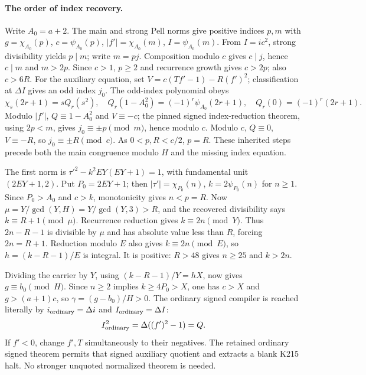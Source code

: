 \paragraph{The order of index recovery.}
Write $A_0=a+2$. The main and strong Pell norms give positive indices $p,m$
with $g=\chi_{A_0}(p)$, $c=\psi_{A_0}(p)$,
$|f'|=\chi_{A_0}(m)$, $I=\psi_{A_0}(m)$.
From $I=ic^2$, strong divisibility yields $p\mid m$; write $m=pj$.
Composition modulo $c$ gives $c\mid j$, hence $c\mid m$ and $m>2p$.
Since $c>1$, $p\ge2$ and recurrence growth gives $c>2p$; also $c>6R$.
For the auxiliary equation, set
$V=c(Tf'-1)-R(f')^2$; classification at $\Delta I$ gives an odd index
$j_0$. The odd-index polynomial obeys
\[
 \chi_s(2r+1)=sQ_r(s^2),\quad
 Q_r(1-A_0^2)=(-1)^r\psi_{A_0}(2r+1),\quad
 Q_r(0)=(-1)^r(2r+1).
\]
Modulo $|f'|$, $Q\equiv1-A_0^2$ and $V\equiv-c$; the pinned signed
index-reduction theorem, using $2p<m$, gives $j_0\equiv\pm p\pmod m$,
hence modulo $c$. Modulo $c$, $Q\equiv0$, $V\equiv-R$, so
$j_0\equiv\pm R\pmod c$. As $0<p,R<c/2$, $p=R$.
These inherited steps precede both the main congruence modulo $H$ and the
missing index equation.

The first norm is $\tau'^2-k^2EY(EY+1)=1$, with fundamental unit
$(2EY+1,2)$. Put $P_0=2EY+1$; then
$|\tau'|=\chi_{P_0}(n)$, $k=2\psi_{P_0}(n)$ for $n\ge1$.
Since $P_0>A_0$ and $c>k$, monotonicity gives $n<p=R$.
Now $\mu=Y/\gcd(Y,H)=Y/\gcd(Y,3)>R$, and the recovered divisibility
says $k\equiv R+1\pmod\mu$. Recurrence reduction gives
$k\equiv2n\pmod Y$. Thus $2n-R-1$ is divisible by $\mu$ and has absolute
value less than $R$, forcing $2n=R+1$. Reduction modulo $E$ also gives
$k\equiv2n\pmod E$, so $h=(k-R-1)/E$ is integral. It is positive:
$R>48$ gives $n\ge25$ and $k>2n$.

Dividing the carrier by $Y$, using $(k-R-1)/Y=hX$, now gives
$g\equiv b_0\pmod H$. Since $n\ge2$ implies $k\ge4P_0>X$, one has
$c>X$ and $g>(a+1)c$, so $\gamma=(g-b_0)/H>0$.
The ordinary signed compiler is reached literally by
$i_{\rm ordinary}=\Delta i$ and $I_{\rm ordinary}=\Delta I$:
\[
 I_{\rm ordinary}^2=\Delta((f')^2-1)=Q.
\]
If $f'<0$, change $f',T$ simultaneously to their negatives. The retained
ordinary signed theorem permits that signed auxiliary quotient and extracts
a blank K215 halt. No stronger unquoted normalized theorem is needed.

